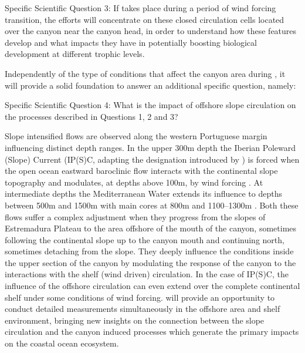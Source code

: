 \textsf{Specific Scientific Question 3:} If \proj takes place during a
period of wind forcing transition, the efforts will concentrate on
these closed circulation cells located over the canyon near the canyon
head, in order to understand how these features develop and what
impacts they have in potentially boosting biological development at
different trophic levels.

Independently of the type of conditions that affect the \naz canyon
area during \proje, it will provide a solid foundation to answer an
additional specific question, namely:

\textsf{Specific Scientific Question 4:} What is the impact of
offshore slope circulation on the processes described in
\textsf{Questions 1, 2 and 3}?

Slope intensified flows are observed along the western Portuguese
margin influencing distinct depth ranges. In the upper 300m depth the
Iberian Poleward (Slope) Current (IP(S)C, adapting the designation
introduced by \cite{peliz03}) is forced when the open ocean eastward
baroclinic flow interacts with the continental slope topography and
modulates, at depths above 100m, by wind forcing
\cite{frouin90,haynes90}. At intermediate depths the Mediterranean
Water extends its influence to depths between 500m and 1500m with main
cores at 800m and 1100--1300m \cite{fiuza98}. Both these flows suffer
a complex adjustment when they progress from the slopes of Estremadura
Plateau to the area offshore of the mouth of the \naz canyon,
sometimes following the continental slope up to the canyon mouth and
continuing north, sometimes detaching from the slope. They deeply
influence the conditions inside the upper section of the canyon by
modulating the response of the canyon to the interactions with the
shelf (wind driven) circulation. In the case of IP(S)C, the influence
of the offshore circulation can even extend over the complete
continental shelf under some conditions of wind forcing. \proj will
provide an opportunity to conduct detailed measurements simultaneously
in the offshore area and shelf environment, bringing new insights on
the connection between the slope circulation and the canyon induced
processes which generate the primary impacts on the coastal ocean
ecosystem.

\par


